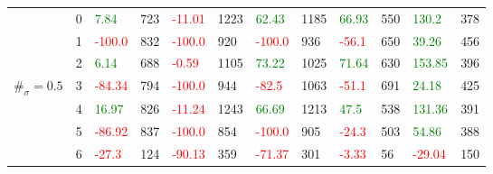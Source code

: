 \begin{table}[!htb]
\begin{adjustwidth}{-0.8in}{-0.9in}
\begin{tabular}{|p{4em}|p{2em}|p{3em}|p{3em}|p{3em}|p{3em}|p{3em}|p{3em}|p{3em}|p{3em}|p{3em}|p{3em}|}
            & 0 & \textcolor{green}{7.84} & 723 & \textcolor{red}{-11.01} & 1223 & \textcolor{green}{62.43} & 1185 & \textcolor{green}{66.93} & 550 & \textcolor{green}{130.2} & 378\\\cline{3-12}
            & 1 & \textcolor{red}{-100.0} & 832 & \textcolor{red}{-100.0} & 920 & \textcolor{red}{-100.0} & 936 & \textcolor{red}{-56.1} & 650 & \textcolor{green}{39.26} & 456\\\cline{3-12}
            & 2 & \textcolor{green}{6.14} & 688 & \textcolor{red}{-0.59} & 1105 & \textcolor{green}{73.22} & 1025 & \textcolor{green}{71.64} & 630 & \textcolor{green}{153.85} & 396\\\cline{3-12}
            $\#_{\sigma}=0.5$ & 3 & \textcolor{red}{-84.34} & 794 & \textcolor{red}{-100.0} & 944 & \textcolor{red}{-82.5} & 1063 & \textcolor{red}{-51.1} & 691 & \textcolor{green}{24.18} & 425\\\cline{3-12}
            & 4 & \textcolor{green}{16.97} & 826 & \textcolor{red}{-11.24} & 1243 & \textcolor{green}{66.69} & 1213 & \textcolor{green}{47.5} & 538 & \textcolor{green}{131.36} & 391\\\cline{3-12}
            & 5 & \textcolor{red}{-86.92} & 837 & \textcolor{red}{-100.0} & 854 & \textcolor{red}{-100.0} & 905 & \textcolor{red}{-24.3} & 503 & \textcolor{green}{54.86} & 388\\\cline{3-12}
            & 6 & \textcolor{red}{-27.3} & 124 & \textcolor{red}{-90.13} & 359 & \textcolor{red}{-71.37} & 301 & \textcolor{red}{-3.33} & 56 & \textcolor{red}{-29.04} & 150\\\hline\hline
            

\end{tabular}
\end{adjustwidth}
\end{table}
